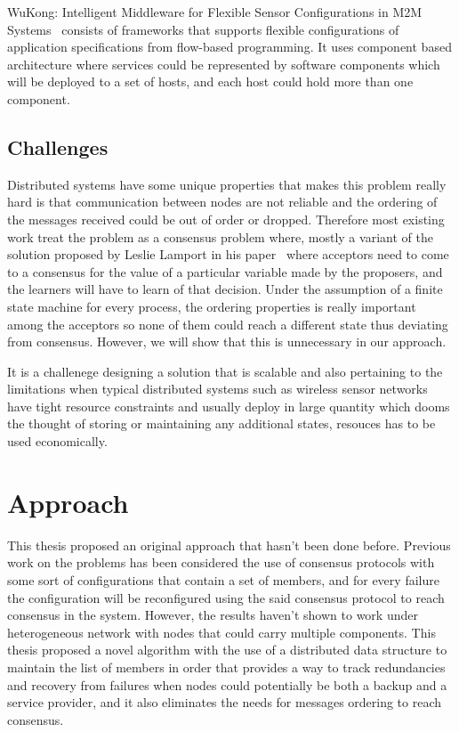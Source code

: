 WuKong: Intelligent Middleware for Flexible Sensor Configurations in M2M
Systems~\cite{Reijers} consists of frameworks that supports flexible
configurations of application specifications from flow-based programming.
It uses component based architecture where services could be represented by
software components which will be deployed to a set of hosts, and each host
could hold more than one component.

\subsection{Challenges}

Distributed systems have some unique properties that makes this problem really hard is that communication between nodes are not reliable and the ordering of the messages received could be out of order or dropped. Therefore most existing work treat the problem as a consensus problem where, mostly a variant of the solution proposed by Leslie Lamport in his paper~\cite{Lamport2001} where acceptors need to come to a consensus for the value of a particular variable made by the proposers, and the learners will have to learn of that decision. Under the assumption of a finite state machine for every process, the ordering properties is really important among the acceptors so none of them could reach a different state thus deviating from consensus. However, we will show that this is unnecessary in our approach.

It is a challenege designing a solution that is scalable and also pertaining to the limitations when typical distributed systems such as wireless sensor networks have tight resource constraints and usually deploy in large quantity which dooms the thought of storing or maintaining any additional states, resouces has to be used economically. 

\section{Approach}

This thesis proposed an original approach that hasn't been done before.
Previous work on the problems has been considered the use of consensus
protocols with some sort of configurations that contain a set of members, and
for every failure the configuration will be reconfigured using the said
consensus protocol to reach consensus in the system. However, the results
haven't shown to work under heterogeneous network with nodes that could carry
multiple components. This thesis proposed a novel algorithm with the use of
a distributed data structure to maintain the list of members in order that
provides a way to track redundancies and recovery from failures when nodes
could potentially be both a backup and a service provider, and it also
eliminates the needs for messages ordering to reach consensus.

